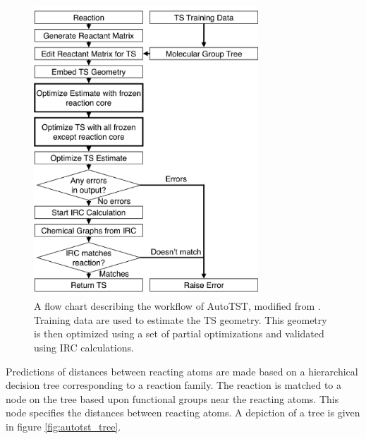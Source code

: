 \documentclass[preprint, 11pt]{elsarticle} %
\begin{document}
\begin{figure}[h!]
    \centering
    \includegraphics[width=0.75\textwidth]{autotst_overview}
    \caption{A flow chart describing the workflow of AutoTST, modified from \cite{bhoorasingh:2017}. Training data are used to estimate the TS geometry. This geometry is then optimized using a set of partial optimizations and validated using IRC calculations.}
    \label{fig:autotst-overview}
\end{figure}

Predictions of distances between reacting atoms are made based on a hierarchical decision tree corresponding to a reaction family.
The reaction is matched to a node on the tree based upon functional groups near the reacting atoms. This node specifies the distances between reacting atoms.
A depiction of a tree is given in figure \ref{fig:autotst_tree}.
\end{document}
